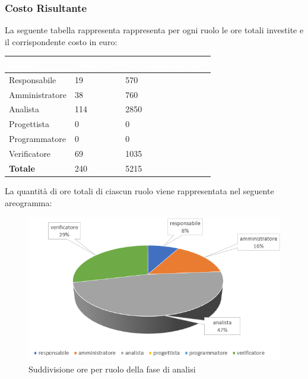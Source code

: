 \clearpage
\subsubsection{Costo Risultante}
La seguente tabella rappresenta rappresenta per ogni ruolo le ore totali investite e il corrispondente costo in euro:
{
\renewcommand{\arraystretch}{2}
\begin{table}[h]
\centering
\caption{Tabella del costo risultante di Analisi}
\begin{longtable}{ C{3cm} C{2cm} C{4cm}}
	\textcolor{white}{\textbf{Ruolo}} & 
	\textcolor{white}{\textbf{Totale ore}} & 
	\textcolor{white}{\textbf{Costo ruolo in euro}}\\	
\endhead

        Responsabile & 19 & 570\\
        Amministratore & 38 & 760\\
        Analista & 114 & 2850 \\
        Progettista & 0 & 0 \\
        Programmatore & 0 & 0 \\
        Verificatore & 69 & 1035 \\
        \textbf{Totale} & 240 & 5215 \\
		
	\end{longtable}
\end{table}
}


La quantità di ore totali di ciascun ruolo viene rappresentata nel seguente areogramma:

\begin{figure}[h]
\centering
	\caption{Suddivisione ore per ruolo della fase di analisi}
	\includegraphics[scale=2]{sezioni/Aerogrammi/AerogrammaAnalisi.png}
\end{figure}
\clearpage

